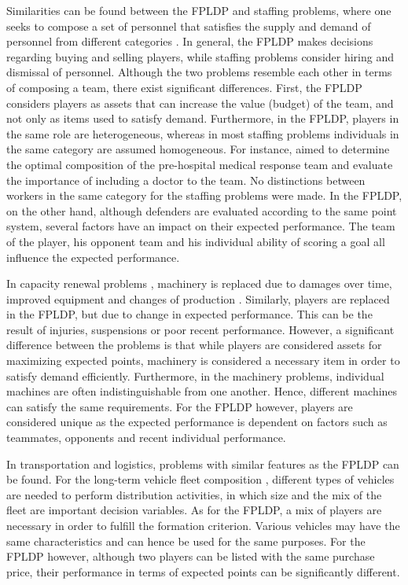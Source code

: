 Similarities can be found between the FPLDP and staffing problems, where one seeks to compose a set of personnel that satisfies the supply and demand of personnel from different categories \citep{Komarudin,Bruecker}. In general, the FPLDP makes decisions regarding buying and selling players, while staffing problems consider hiring and dismissal of personnel. Although the two problems resemble each other in terms of composing a team, there exist significant differences. First, the FPLDP considers players as assets that can increase the value (budget) of the team, and not only as items used to satisfy demand. Furthermore, in the FPLDP, players in the same role are heterogeneous, whereas in most staffing problems individuals in the same category are assumed homogeneous. For instance, \cite{Davis} aimed to determine the optimal composition of the pre-hospital medical response team and evaluate the importance of including a doctor to the team. No distinctions between workers in the same category for the staffing problems were made. In the FPLDP, on the other hand, although defenders are evaluated according to the same point system, several factors have an impact on their expected performance. The team of the player, his opponent team and his individual ability of scoring a goal all influence the expected performance.

\newpar

In capacity renewal problems \citep{Chand,Rajagopalan}, machinery is replaced due to damages over time, improved equipment and changes of production \citep{Hopp,Adkins}. Similarly, players are replaced in the FPLDP, but due to change in expected performance. This can be the result of injuries, suspensions or poor recent performance. However, a significant difference between the problems is that while players are considered assets for maximizing expected points, machinery is considered a necessary item in order to satisfy demand efficiently. Furthermore, in the machinery problems, individual machines are often indistinguishable from one another. Hence, different machines can satisfy the same requirements. For the FPLDP however, players are considered unique as the expected performance is dependent on factors such as teammates, opponents and recent individual performance.

\newpar

In transportation and logistics, problems with similar features as the FPLDP can be found. For the long-term vehicle fleet composition \citep{Jabali}, different types of vehicles are needed to perform distribution activities, in which size and the mix of the fleet are important decision variables. As for the FPLDP, a mix of players are necessary in order to fulfill the formation criterion. Various vehicles may have the same characteristics and can hence be used for the same purposes. For the FPLDP however, although two players can be listed with the same purchase price, their performance in terms of expected points can be significantly different.


